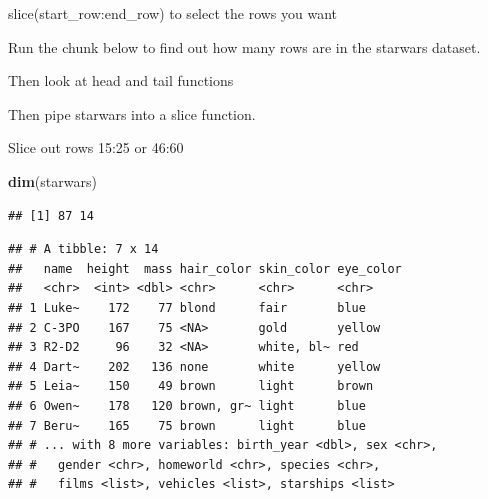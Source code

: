 \documentclass[
]{book}
\newenvironment{Shaded}{\begin{snugshade}}{\end{snugshade}}
\newcommand{\DecValTok}[1]{\textcolor[rgb]{0.00,0.00,0.81}{#1}}
\newcommand{\KeywordTok}[1]{\textcolor[rgb]{0.13,0.29,0.53}{\textbf{#1}}}
\newcommand{\NormalTok}[1]{#1}
\newcommand{\OperatorTok}[1]{\textcolor[rgb]{0.81,0.36,0.00}{\textbf{#1}}}
\newcommand{\StringTok}[1]{\textcolor[rgb]{0.31,0.60,0.02}{#1}}
\begin{document}
slice(start\_row:end\_row) to select the rows you want

Run the chunk below to find out how many rows are in the starwars dataset.

Then look at head and tail functions

Then pipe starwars into a slice function.

Slice out rows 15:25
or
46:60

\begin{Shaded}
\begin{Highlighting}[]
\KeywordTok{dim}\NormalTok{(starwars)}
\end{Highlighting}
\end{Shaded}

\begin{verbatim}
## [1] 87 14
\end{verbatim}

\begin{Shaded}
\end{Shaded}

\begin{verbatim}
## # A tibble: 7 x 14
##   name  height  mass hair_color skin_color eye_color
##   <chr>  <int> <dbl> <chr>      <chr>      <chr>    
## 1 Luke~    172    77 blond      fair       blue     
## 2 C-3PO    167    75 <NA>       gold       yellow   
## 3 R2-D2     96    32 <NA>       white, bl~ red      
## 4 Dart~    202   136 none       white      yellow   
## 5 Leia~    150    49 brown      light      brown    
## 6 Owen~    178   120 brown, gr~ light      blue     
## 7 Beru~    165    75 brown      light      blue     
## # ... with 8 more variables: birth_year <dbl>, sex <chr>,
## #   gender <chr>, homeworld <chr>, species <chr>,
## #   films <list>, vehicles <list>, starships <list>
\end{verbatim}

\begin{Shaded}
\end{Shaded}
\end{document}
